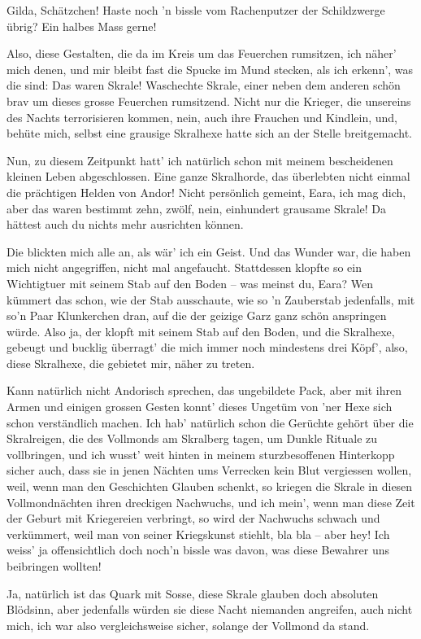 \documentclass[10pt, a4paper, oneside]{book}
\begin{document}
Gilda, Schätzchen! Haste noch ’n bissle vom Rachenputzer der Schildzwerge übrig? Ein halbes Mass gerne!

Also, diese Gestalten, die da im Kreis um das Feuerchen rumsitzen, ich näher’ mich denen, und mir bleibt fast die Spucke im Mund stecken, als ich erkenn’, was die sind: Das waren Skrale! Waschechte Skrale, einer neben dem anderen schön brav um dieses grosse Feuerchen rumsitzend. Nicht nur die Krieger, die unsereins des Nachts terrorisieren kommen, nein, auch ihre Frauchen und Kindlein, und, behüte mich, selbst eine grausige Skralhexe hatte sich an der Stelle breitgemacht.

Nun, zu diesem Zeitpunkt hatt’ ich natürlich schon mit meinem bescheidenen kleinen Leben abgeschlossen. Eine ganze Skralhorde, das überlebten nicht einmal die prächtigen Helden von Andor! Nicht persönlich gemeint, Eara, ich mag dich, aber das waren bestimmt zehn, zwölf, nein, einhundert grausame Skrale! Da hättest auch du nichts mehr ausrichten können.

Die blickten mich alle an, als wär’ ich ein Geist. Und das Wunder war, die haben mich nicht angegriffen, nicht mal angefaucht. Stattdessen klopfte so ein Wichtigtuer mit seinem Stab auf den Boden – was meinst du, Eara? Wen kümmert das schon, wie der Stab ausschaute, wie so 'n Zauberstab jedenfalls, mit so’n Paar Klunkerchen dran, auf die der geizige Garz ganz schön anspringen würde. Also ja, der klopft mit seinem Stab auf den Boden, und die Skralhexe, gebeugt und bucklig überragt’ die mich immer noch mindestens drei Köpf’, also, diese Skralhexe, die gebietet mir, näher zu treten.

Kann natürlich nicht Andorisch sprechen, das ungebildete Pack, aber mit ihren Armen und einigen grossen Gesten konnt’ dieses Ungetüm von ’ner Hexe sich schon verständlich machen. Ich hab’ natürlich schon die Gerüchte gehört über die Skralreigen, die des Vollmonds am Skralberg tagen, um Dunkle Rituale zu vollbringen, und ich wusst’ weit hinten in meinem sturzbesoffenen Hinterkopp sicher auch, dass sie in jenen Nächten ums Verrecken kein Blut vergiessen wollen, weil, wenn man den Geschichten Glauben schenkt, so kriegen die Skrale in diesen Vollmondnächten ihren dreckigen Nachwuchs, und ich mein’, wenn man diese Zeit der Geburt mit Kriegereien verbringt, so wird der Nachwuchs schwach und verkümmert, weil man von seiner Kriegskunst stiehlt, bla bla – aber hey! Ich weiss’ ja offensichtlich doch noch’n bissle was davon, was diese Bewahrer uns beibringen wollten!

Ja, natürlich ist das Quark mit Sosse, diese Skrale glauben doch absoluten Blödsinn, aber jedenfalls würden sie diese Nacht niemanden angreifen, auch nicht mich, ich war also vergleichsweise sicher, solange der Vollmond da stand.
\end{document}
